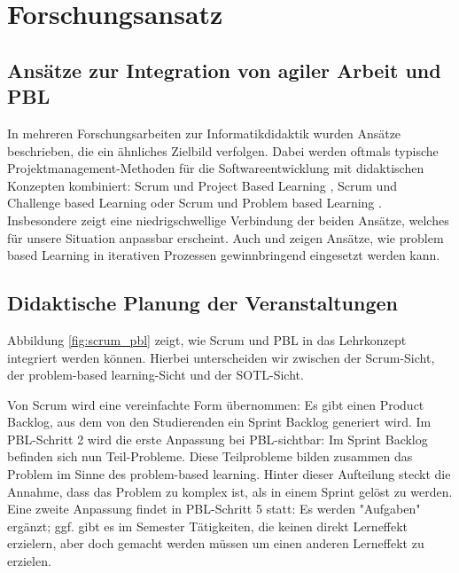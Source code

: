 \documentclass[a4paper,12pt]{article}
\begin{document}
\section{Forschungsansatz}

\subsection{Ansätze zur Integration von agiler Arbeit und PBL}
In mehreren Forschungsarbeiten zur Informatikdidaktik wurden Ansätze beschrieben, die ein ähnliches Zielbild verfolgen. Dabei werden oftmals typische Projektmanagement-Methoden für die Softwareentwicklung mit didaktischen Konzepten kombiniert: Scrum und Project Based Learning \cite{fernandes2021improving}, Scrum und Challenge based Learning \cite{santos2015combining} oder Scrum und Problem based Learning \cite{da2022scrum}. Insbesondere \cite{da2022scrum} zeigt eine niedrigschwellige Verbindung der beiden Ansätze, welches für unsere Situation anpassbar erscheint. Auch \cite{meissner2015brauchen} und \cite{kenneweg2025problem} zeigen Ansätze, wie problem based Learning in iterativen Prozessen gewinnbringend eingesetzt werden kann.





\subsection{Didaktische Planung der Veranstaltungen}

Abbildung \ref{fig:scrum_pbl} zeigt, wie Scrum und PBL in das Lehrkonzept integriert werden können. Hierbei unterscheiden wir zwischen der Scrum-Sicht, der problem-based learning-Sicht und der SOTL-Sicht.

Von Scrum wird eine vereinfachte Form übernommen: Es gibt einen Product Backlog, aus dem von den Studierenden ein Sprint Backlog generiert wird. Im PBL-Schritt 2 wird die erste Anpassung bei PBL-sichtbar: Im Sprint Backlog befinden sich nun Teil-Probleme. Diese Teilprobleme bilden zusammen das Problem im Sinne des problem-based learning. Hinter dieser Aufteilung steckt die Annahme, dass das Problem zu komplex ist, als in einem Sprint gelöst zu werden. Eine zweite Anpassung findet in PBL-Schritt 5 statt: Es werden "Aufgaben" ergänzt; ggf. gibt es im Semester Tätigkeiten, die keinen direkt Lerneffekt erzielern, aber doch gemacht werden müssen um einen anderen Lerneffekt zu erzielen.
\end{document}
